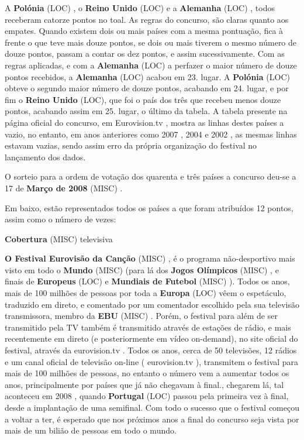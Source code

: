 \documentclass[12pt,a4paper]{article}
\begin{document}
A \textbf{Polónia} (LOC) , o \textbf{Reino Unido} (LOC) e a \textbf{Alemanha} (LOC) , todos receberam catorze pontos no toal. As regras do concurso, são claras quanto aos empates. Quando existem dois ou mais países com a mesma pontuação, fica à frente o que teve mais douze pontos, se dois ou mais tiverem o mesmo número de douze pontos, passam a contar os dez pontos, e assim sucessivamente. Com as regras aplicadas, e com a \textbf{Alemanha} (LOC) a perfazer o maior número de douze pontos recebidos, a \textbf{Alemanha} (LOC) acabou em 23. lugar. A \textbf{Polónia} (LOC) obteve o segundo maior número de douze pontos, acabando em 24. lugar, e por fim o \textbf{Reino Unido} (LOC), que foi o país dos três que recebeu menos douze pontos, acabando assim em 25. lugar, o último da tabela. A tabela presente na página oficial do concurso, em Eurovision.tv , mostra as linhas destes países a vazio, no entanto, em anos anteriores como 2007 , 2004 e 2002 , as mesmas linhas estavam vazias, sendo assim erro da própria organização do festival no lançamento dos dados.

O sorteio para a ordem de votação dos quarenta e três países a concurso deu-se a 17 de \textbf{Março de 2008} (MISC) .

Em baixo, estão representados todos os países a que foram atribuídos 12 pontos, assim como o número de vezes:



\textbf{Cobertura} (MISC) televisiva

\textbf{O Festival Eurovisão da Canção} (MISC) , é o programa não-desportivo mais visto em todo o \textbf{Mundo} (MISC) (para lá dos \textbf{Jogos Olímpicos} (MISC) , e finais de \textbf{Europeus} (LOC) e \textbf{Mundiais de Futebol} (MISC) ). Todos os anos, mais de 100 milhões de pessoas por toda a \textbf{Europa} (LOC) vêem o espetáculo, traduzido em direto, e comentado por um comentador escolhido pela sua televisão transmissora, membro da \textbf{EBU} (MISC) . Porém, o festival para além de ser transmitido pela TV também é transmitido através de estações de rádio, e mais recentemente em direto (e posteriormente em vídeo on-demand), no site oficial do festival, através da eurovision.tv . Todos os anos, cerca de 50 televisões, 12 rádios e um canal oficial de televisão on-line ( eurovision.tv ), transmitem o festival para mais de 100 milhões de pessoas, no entanto o número vem a aumentar todos os anos, principalmente por países que já não chegavam à final., chegarem lá, tal aconteceu em 2008 , quando \textbf{Portugal} (LOC) passou pela primeira vez à final, desde a implantação de uma semifinal. Com todo o sucesso que o festival começou a voltar a ter, é esperado que nos próximos anos a final do concurso seja vista por mais de um bilião de pessoas em todo o mundo.
\end{document}

